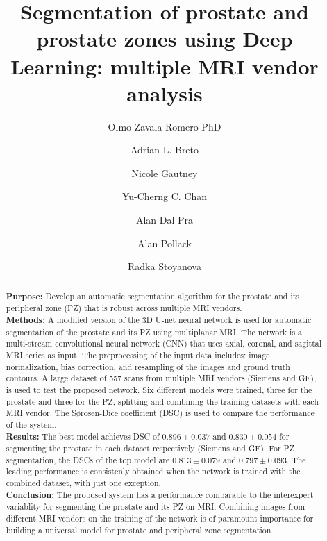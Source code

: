 \documentclass[num-refs]{wiley-article}
\title{ Segmentation of prostate and prostate zones using Deep Learning: multiple MRI vendor analysis }
\author[1]{Olmo Zavala-Romero PhD}
\author[1]{Adrian L. Breto }
\author[1]{Nicole Gautney}
\author[1]{Yu-Cherng C. Chan}
\author[1]{Alan Dal Pra}
\author[1]{Alan Pollack}
\author[1]{Radka Stoyanova}
\affil[1]{Radiation Oncology, University of Miami Miller School of Medicine,
                Miami, FL, 33136, USA}
\begin{document}
\maketitle

\begin{abstract} %
\small{
\textbf{Purpose:} Develop an automatic segmentation algorithm for the prostate and its peripheral zone (PZ) that
is robust across multiple MRI vendors. \\
\textbf{Methods:} A modified version of the 3D U-net neural network is used for automatic segmentation of the 
prostate and its PZ using multiplanar MRI. The network is a multi-stream convolutional neural network (CNN) that uses axial, coronal, and sagittal MRI series as input. The preprocessing of the input data includes: image normalization, bias correction, and resampling of the images and ground truth contours. A large dataset of 557 scans from multiple MRI vendors (Siemens and GE), 
is used to test the proposed network. Six different models were trained, three for the prostate and three for the
PZ, splitting and combining the training datasets with each MRI vendor. The S\o rosen-Dice coefficient (DSC) is used to compare the  performance of the system. \\
\textbf{Results:} The best model achieves DSC of $0.896 \pm 0.037$ and  $0.830 \pm 0.054$ for segmenting the prostate in each dataset respectively (Siemens and GE). For PZ segmentation, the DSCs of the top model are $0.813 \pm 0.079$ and $0.797 \pm 0.093$. The leading performance is consistenly obtained when the network is trained with the combined dataset, with just one exception. \\
\textbf{Conclusion:} The proposed system has a performance comparable to the interexpert variablity for segmenting the prostate and its PZ on MRI. Combining images from different MRI vendors on the training of the network is of paramount importance for building a universal model for prostate and peripheral zone segmentation. 

}
\end{abstract}
\end{document}
